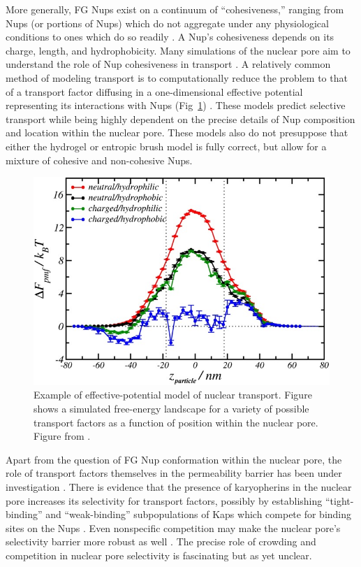 
More generally, FG Nups exist on a continuum of ``cohesiveness,'' ranging from Nups (or portions of Nups) which do not aggregate under any physiological conditions to ones which do so readily \cite{hough15}.  A Nup's cohesiveness depends on its charge, length, and hydrophobicity.  Many simulations of the nuclear pore aim to understand the role of Nup cohesiveness in transport \cite{gu19,tagliazucchi13,nasrabad16,mincer11}.   A relatively common method of modeling transport is to computationally reduce the problem to that of a transport factor diffusing in a one-dimensional effective potential representing its interactions with Nups (Fig~\ref{fig:effective-potential}) \cite{tagliazucchi13, zilman07,tu13, timney16}.  These models predict selective transport while being highly dependent on the precise details of Nup composition and location within the nuclear pore.  These models also do not presuppose that either the hydrogel or entropic brush model is fully correct, but allow for a mixture of cohesive and non-cohesive Nups.

\begin{figure}
\centering
\includegraphics[width=0.5\linewidth]{figs/ch01/tagliazucchi}
\caption[Effective-potential model of nuclear transport.]{Example of effective-potential model of nuclear transport.  Figure shows a simulated free-energy landscape for a variety of possible transport factors as a function of position within the nuclear pore. Figure from \cite{tagliazucchi13}.}
\label{fig:effective-potential}
\end{figure}

Apart from the question of FG Nup conformation within the nuclear pore, the role of transport factors themselves in the permeability barrier has been under investigation \cite{kapinos18,kapinos17,schleicher14,kapinos14}.  There is evidence that the presence of karyopherins in the nuclear pore increases its selectivity for transport factors, possibly by establishing ``tight-binding'' and ``weak-binding'' subpopulations of Kaps which compete for binding sites on the Nups \cite{wagner15}.  Even nonspecific competition may make the nuclear pore's selectivity barrier more robust as well \cite{tetenbaum-novatt12,zilman09,zilman10,timney06}.  The precise role of crowding and competition in nuclear pore selectivity is fascinating but as yet unclear.

